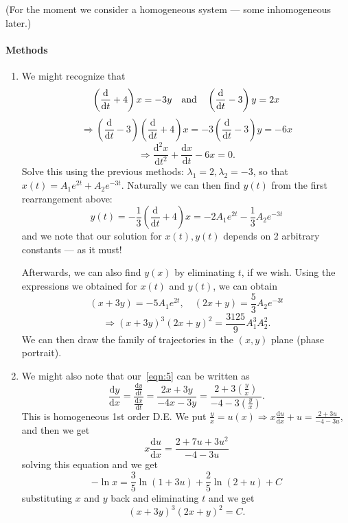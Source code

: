 \documentclass[12pt]{report}
\theoremstyle{definition}
\begin{document}
(For the moment we consider a homogeneous system --- some inhomogeneous later.)

\paragraph{Methods}
\;

\begin{enumerate}[label = (\arabic*)]
    \item We might recognize that \[
            \left(\frac{\mathrm{d}}{\mathrm{d}t} + 4\right) x = -3y \quad\textnormal{and}\quad
            \left(\frac{\mathrm{d}}{\mathrm{d}t} - 3\right) y = 2x
    \]\[
    \Rightarrow{} \left(\frac{\mathrm{d}}{\mathrm{d}t} - 3\right) 
    \left(\frac{\mathrm{d}}{\mathrm{d}t} + 4\right) x
    = -3\left(\frac{\mathrm{d}}{\mathrm{d}t} - 3\right) y = -6x
    \]\[
        \Rightarrow{}\frac{\mathrm{d}^{2}x}{\mathrm{d}t^{2}} + \frac{\mathrm{d}x}{\mathrm{d}t} - 6x = 0.
    \]
    Solve this using the previous methods: $\lambda_1 = 2, \lambda_2 = -3$, so that
    $x(t) = A_1e^{2t} + A_2e^{-3t}$. Naturally we can then find $y(t)$ from the first rearrangement above:\[
        y(t) = -\frac{1}{3}\left(\frac{\mathrm{d}}{\mathrm{d}t} + 4\right) x
        = -2A_1e^{2t} - \frac{1}{3}A_2e^{-3t}
    \]and we note that our solution for $x(t), y(t)$ depends on 2 arbitrary constants --- as it must!

    Afterwards, we can also find $y(x)$ by eliminating $t$, if we wish. Using the expressions we obtained
    for $x(t)$ and $y(t)$, we can obtain \[
        (x + 3y) = -5A_1e^{2t}, \quad (2x + y) = \frac{5}{3}A_2e^{-3t}
    \]\[
    \Rightarrow{} {(x + 3y)}^{3} {(2x + y)}^{2} = \frac{3125}{9}A_1^{3}A_2^{2}.
    \]
    We can then draw the family of trajectories in the $(x,y)$ plane (phase portrait).

\item We might also note that our~\eqref{eqn:5} can be written as\[
    \frac{\mathrm{d}y}{\mathrm{d}x} = \frac{\frac{\mathrm{d}y}{\mathrm{d}t} }{\frac{\mathrm{d}x}{\mathrm{d}t} }
    = \frac{2x + 3y}{-4x - 3y} = \frac{2 + 3 \left(\frac{y}{x}\right) }{-4 - 3 \left(\frac{y}{x}\right) }.
\]
This is homogeneous 1st order D.E. We put $\frac{y}{x} = u(x) \Rightarrow{} x\frac{\mathrm{d}u}{\mathrm{d}x} 
+ u = \frac{2 + 3u}{-4 - 3u}$, and then we get\[
    x\frac{\mathrm{d}u}{\mathrm{d}x} = \frac{2 + 7u + 3u^{2}}{-4 - 3u}
\]solving this equation and we get\[
    -\ln{x} = \frac{3}{5}\ln{(1 + 3u)} + \frac{2}{5}\ln{(2 + u)} + C
\]substituting $x$ and $y$ back and eliminating $t$ and we get\[
{(x + 3y)}^{3}{(2x + y)}^{2} = C.
\]


\end{enumerate}
\end{document}
